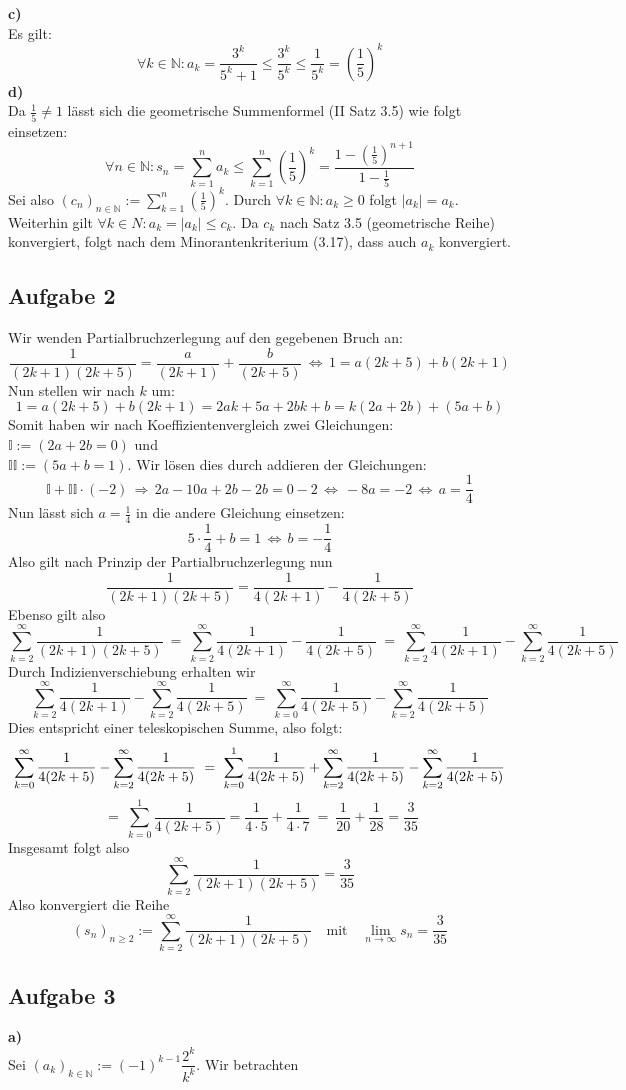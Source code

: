 \documentclass[a4paper,graphics,11pt]{article}
\newcommand{\aufgabe}[1]{\subsection*{Aufgabe #1}}
\begin{document}
\textbf{c)}\\[5pt]
Es gilt:
$$
    \forall k \in \mathbb{N} \colon a_k = \frac{3^k}{5^k+1} \leq \frac{3^k}{5^k} \leq \frac{1}{5^k}
    = \left(\frac{1}{5}\right)^k
$$
\newpage
\textbf{d)}\\[5pt]
Da $\frac{1}{5}\neq1$ lässt sich die geometrische Summenformel (II Satz 3.5)
wie folgt einsetzen:
$$
    \forall n \in \mathbb{N} \colon s_n = \sum_{k=1}^{n} a_k
    \leq \sum_{k=1}^{n} \left(\frac{1}{5}\right)^k
    = \frac{1-\left(\frac{1}{5}\right)^{n+1}}{1-\frac{1}{5}}
$$
Sei also $(c_n)_{n \in \mathbb{N}} := \sum_{k=1}^{n} \left(\frac{1}{5}\right)^k$.
Durch $\forall k \in \mathbb{N} \colon a_k \geq 0$ folgt $|a_k| = a_k$.\\
Weiterhin gilt $\forall k \in N\colon a_k = |a_k| \leq c_k$. Da $c_k$ nach
Satz 3.5 (geometrische Reihe) konvergiert, folgt nach dem Minorantenkriterium (3.17), dass
auch $a_k$ konvergiert.
\aufgabe{2}
Wir wenden Partialbruchzerlegung auf den gegebenen Bruch an:
$$
    \frac{1}{(2k+1)(2k+5)} = \frac{a}{(2k+1)} + \frac{b}{(2k+5)} \,\Longleftrightarrow\,
    1 = a(2k+5) + b(2k+1)
$$
Nun stellen wir nach $k$ um:
$$
    1 = a(2k+5) + b(2k+1) = 2ak+5a+2bk+b = k(2a+2b) + (5a+b)
$$
Somit haben wir nach Koeffizientenvergleich zwei Gleichungen: $ \mathbb{I}:=(2a+2b = 0)$
und \\$\mathbb{II}:=(5a+b = 1)$. Wir lösen dies durch addieren der Gleichungen:
$$
    \mathbb{I} + \mathbb{II}\cdot(-2) \,\Longrightarrow\, 2a-10a+2b-2b=0-2
    \,\Longleftrightarrow\, -8a = -2
    \,\Longleftrightarrow\, a = \frac{1}{4}
$$
Nun lässt sich $a = \frac{1}{4}$ in die andere Gleichung einsetzen:
$$
    5\cdot \frac{1}{4}+b = 1 \,\Longleftrightarrow\, b = -\frac{1}{4}
$$
Also gilt nach Prinzip der Partialbruchzerlegung nun
$$
    \frac{1}{(2k+1)(2k+5)} = \frac{1}{4(2k+1)} - \frac{1}{4(2k+5)}
$$
Ebenso gilt also
$$
    \sum_{k=2}^{\infty} \frac{1}{(2k+1)(2k+5)}
    \ =\ \sum_{k=2}^{\infty} \frac{1}{4(2k+1)} - \frac{1}{4(2k+5)}
    \ =\ \sum_{k=2}^{\infty} \frac{1}{4(2k+1)} - \sum_{k=2}^{\infty} \frac{1}{4(2k+5)}
$$
Durch Indizienverschiebung erhalten wir
$$
    \sum_{k=2}^{\infty} \frac{1}{4(2k+1)} - \sum_{k=2}^{\infty} \frac{1}{4(2k+5)}
    \ =\ \sum_{k=0}^{\infty} \frac{1}{4(2k+5)} - \sum_{k=2}^{\infty} \frac{1}{4(2k+5)}
$$
Dies entspricht einer teleskopischen Summe, also folgt:
$$
    \sum_{k=0}^{\infty} \frac{1}{4(2k+5)} - \sum_{k=2}^{\infty} \frac{1}{4(2k+5)}
    \ =\ \sum_{k=0}^{1} \frac{1}{4(2k+5)} +
    \sum_{k=2}^{\infty} \frac{1}{4(2k+5)} - \sum_{k=2}^{\infty} \frac{1}{4(2k+5)}\\
$$$$
    \ =\ \sum_{k=0}^{1} \frac{1}{4(2k+5)} = \frac{1}{4\cdot 5} + \frac{1}{4\cdot 7} 
    \ =\ \frac{1}{20} + \frac{1}{28} = \frac{3}{35}
$$
Insgesamt folgt also
$$
    \sum_{k=2}^{\infty} \frac{1}{(2k+1)(2k+5)} = \frac{3}{35}
$$
Also konvergiert die Reihe
$$
    (s_n)_{n\geq 2} := \sum_{k=2}^{\infty} \frac{1}{(2k+1)(2k+5)}\quad\text{mit}\quad
    \lim_{n \to \infty} s_n = \frac{3}{35}
$$
\aufgabe{3}
\textbf{a)}\\[5pt]
Sei $(a_k)_{k \in \mathbb{N}} := (-1)^{k-1}\dfrac{2^k}{k^k}$. Wir betrachten
\end{document}
